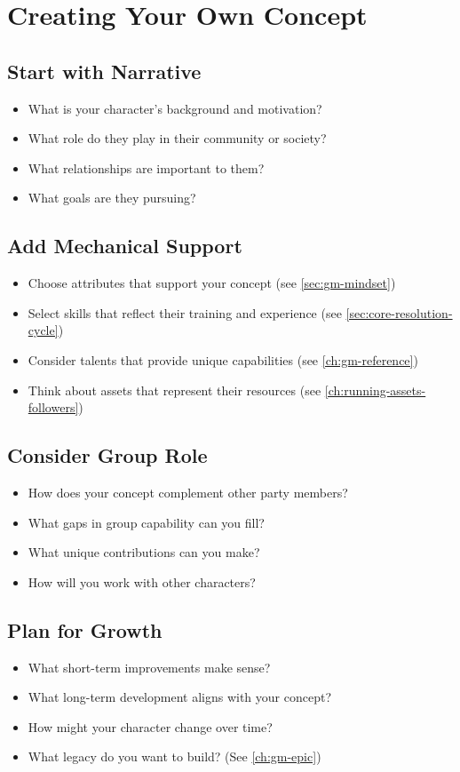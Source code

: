 \section{Creating Your Own Concept}
\label{sec:creating-own-concept}

\subsection*{Start with Narrative}
\begin{itemize}
\item What is your character's background and motivation?
\item What role do they play in their community or society?
\item What relationships are important to them?
\item What goals are they pursuing?
\end{itemize}

\subsection*{Add Mechanical Support}
\begin{itemize}
\item Choose attributes that support your concept (see \ref{sec:gm-mindset})
\item Select skills that reflect their training and experience (see \ref{sec:core-resolution-cycle})
\item Consider talents that provide unique capabilities (see \ref{ch:gm-reference})
\item Think about assets that represent their resources (see \ref{ch:running-assets-followers})
\end{itemize}

\subsection*{Consider Group Role}
\begin{itemize}
\item How does your concept complement other party members?
\item What gaps in group capability can you fill?
\item What unique contributions can you make?
\item How will you work with other characters?
\end{itemize}

\subsection*{Plan for Growth}
\begin{itemize}
\item What short-term improvements make sense?
\item What long-term development aligns with your concept?
\item How might your character change over time?
\item What legacy do you want to build? (See \ref{ch:gm-epic})
\end{itemize}


